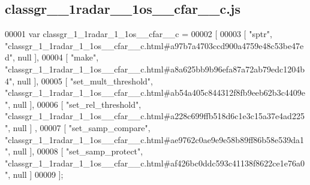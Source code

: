 \subsection{classgr\+\_\+\_\+1radar\+\_\+\_\+1os\+\_\+\+\_\+cfar\+\_\+\+\_\+c.\+js}
\label{classgr__1__1radar__1__1os____cfar____c_8js_source}

\begin{DoxyCode}
00001 var classgr_1_1radar_1_1os__cfar__c =
00002 [
00003     [ \textcolor{stringliteral}{"sptr"}, \textcolor{stringliteral}{"classgr\_1\_1radar\_1\_1os\_\_cfar\_\_c.html#a97b7a4703ccd900a4759e48c53be47ed"}, null ],
00004     [ \textcolor{stringliteral}{"make"}, \textcolor{stringliteral}{"classgr\_1\_1radar\_1\_1os\_\_cfar\_\_c.html#a8a625bb9b96efa87a72ab79edc1204b4"}, null ],
00005     [ \textcolor{stringliteral}{"set\_mult\_threshold"}, \textcolor{stringliteral}{"classgr\_1\_1radar\_1\_1os\_\_cfar\_\_c.html#ab54a405c844312f8fb9eeb62b3c4409e"}, null 
      ],
00006     [ \textcolor{stringliteral}{"set\_rel\_threshold"}, \textcolor{stringliteral}{"classgr\_1\_1radar\_1\_1os\_\_cfar\_\_c.html#a228c699ffb518d6c1e3c15a37e4ad225"}, null ]
      ,
00007     [ \textcolor{stringliteral}{"set\_samp\_compare"}, \textcolor{stringliteral}{"classgr\_1\_1radar\_1\_1os\_\_cfar\_\_c.html#ae9762c0ae9e9e58b89ff86b58e539da1"}, null ],
00008     [ \textcolor{stringliteral}{"set\_samp\_protect"}, \textcolor{stringliteral}{"classgr\_1\_1radar\_1\_1os\_\_cfar\_\_c.html#af426bc0ddc593c41138f8622ce1e76a0"}, null ]
00009 ];
\end{DoxyCode}
